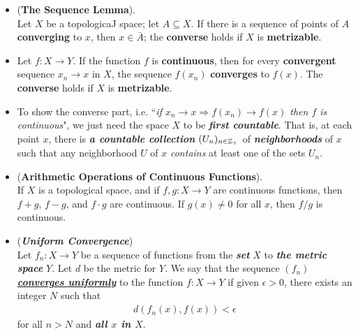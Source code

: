 \documentclass[11pt]{article}
\begin{document}
\begin{itemize}
\item \begin{lemma}(\textbf{The Sequence Lemma}). \citep{munkres2000topology}\\
Let $X$ be a topologicaJ space; let $A \subseteq X$. If there is a sequence of points of $A$ \textbf{converging} to $x$, then $x \in \bar{A}$; the \textbf{converse} holds if $X$ is \textbf{metrizable}.
\end{lemma}

\item \begin{proposition}
Let $f: X \rightarrow Y$. If the function $f$ is \textbf{continuous}, then for every \textbf{convergent} sequence $x_n \rightarrow x$ in $X$, the sequence $f(x_n)$ \textbf{converges} to $f(x)$. The \textbf{converse} holds if $X$ is \textbf{metrizable}.
\end{proposition}

\item \begin{remark}
To show the converse part, i.e. ``\emph{if $x_n \rightarrow x \Rightarrow f(x_n) \rightarrow f(x)$ then $f$ is continuous}", we just need the space $X$ to be \emph{\textbf{first countable}}. That is, at each point $x$, there is \emph{\textbf{a countable collection}} $(U_{n})_{n \in {\mathbb Z}_{+}}$ of \emph{\textbf{neighborhoods}} of $x$ such that any neighborhood $U$ of $x$ \emph{contains} at least one of the sets $U_n$.
\end{remark}

\item \begin{proposition} (\textbf{Arithmetic Operations of Continuous Functions}).\\
If $X$ is a topological space, and if $f, g : X \rightarrow Y$ are continuous functions, then $f + g$,  $f - g$, and $f \cdot g$ are continuous. If $g(x) \neq 0$ for all $x$, then $f/g$ is continuous.
\end{proposition}

\item \begin{definition} (\emph{\textbf{Uniform Convergence}})\\
Let $f_n : X \rightarrow Y$ be a sequence of functions from the \textbf{\emph{set}} $X$ to \emph{\textbf{the metric space}} $Y$. Let $d$ be the metric for $Y$. We say that the sequence $(f_n)$ \underline{\emph{\textbf{converges uniformly}}} to the function $f: X \rightarrow Y$ if given $\epsilon > 0$, there exists an integer $N$ such that
\begin{align*}
d(f_n(x), f(x)) < \epsilon
\end{align*}
for all $n > N$ and \textbf{\emph{all $x$ in $X$}}.
\end{definition}


\end{itemize}
\end{document}
